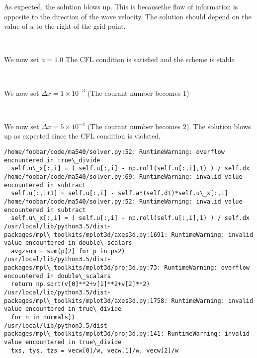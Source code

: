 \documentclass[11pt]{article}
\begin{document}
As expected, the solution blows up. This is becausethe flow of
information is opposite to the direction of the wave velocity. The
solution should depend on the value of \(u\) to the right of the grid
point.

    \begin{center}
    \end{center}
    { \hspace*{\fill} \\}
    
    We now set \(a=1.0\) The CFL condition is satisfied and the scheme is
stable

    \begin{center}
    \end{center}
    { \hspace*{\fill} \\}
    
    We now set \(\Delta x = 1 \times 10^{-3}\) (The courant number becomes
\(1\))

    \begin{center}
    \end{center}
    { \hspace*{\fill} \\}
    
    We now set \(\Delta x = 5 \times 10^{-4}\) (The courant number becomes
\(2\)). The solution blows up as expected since the CFL condition is
violated.

    \begin{Verbatim}[commandchars=\\\{\}]
/home/foobar/code/ma540/solver.py:52: RuntimeWarning: overflow encountered in true\_divide
  self.u\_x[:,i] = ( self.u[:,i] - np.roll(self.u[:,i],1) ) / self.dx
/home/foobar/code/ma540/solver.py:69: RuntimeWarning: invalid value encountered in subtract
  self.u[:,i+1] = self.u[:,i] - self.a*(self.dt)*self.u\_x[:,i]
/home/foobar/code/ma540/solver.py:52: RuntimeWarning: invalid value encountered in subtract
  self.u\_x[:,i] = ( self.u[:,i] - np.roll(self.u[:,i],1) ) / self.dx
/usr/local/lib/python3.5/dist-packages/mpl\_toolkits/mplot3d/axes3d.py:1691: RuntimeWarning: invalid value encountered in double\_scalars
  avgzsum = sum(p[2] for p in ps2)
/usr/local/lib/python3.5/dist-packages/mpl\_toolkits/mplot3d/proj3d.py:73: RuntimeWarning: overflow encountered in double\_scalars
  return np.sqrt(v[0]**2+v[1]**2+v[2]**2)
/usr/local/lib/python3.5/dist-packages/mpl\_toolkits/mplot3d/axes3d.py:1758: RuntimeWarning: invalid value encountered in true\_divide
  for n in normals])
/usr/local/lib/python3.5/dist-packages/mpl\_toolkits/mplot3d/proj3d.py:141: RuntimeWarning: invalid value encountered in true\_divide
  txs, tys, tzs = vecw[0]/w, vecw[1]/w, vecw[2]/w

    \end{Verbatim}
\end{document}
